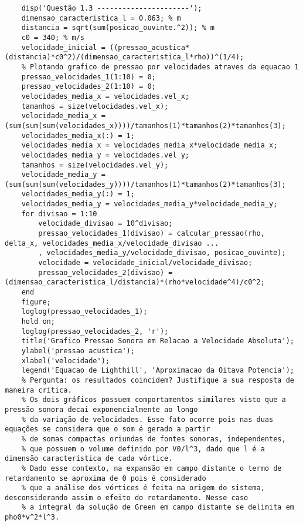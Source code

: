 \begin{enumerate}
\begin{lstlisting}
	disp('Questão 1.3 ----------------------');
	dimensao_caracteristica_l = 0.063; % m
	distancia = sqrt(sum(posicao_ouvinte.^2)); % m 
	c0 = 340; % m/s 
	velocidade_inicial = ((pressao_acustica*(distancia)*c0^2)/(dimensao_caracteristica_l*rho))^(1/4);
	% Plotando grafico de pressao por velocidades atraves da equacao 1
	pressao_velocidades_1(1:10) = 0;
	pressao_velocidades_2(1:10) = 0;
	velocidades_media_x = velocidades.vel_x;
	tamanhos = size(velocidades.vel_x);
	velocidade_media_x = (sum(sum(sum(velocidades_x))))/tamanhos(1)*tamanhos(2)*tamanhos(3);
	velocidades_media_x(:) = 1;
	velocidades_media_x = velocidades_media_x*velocidade_media_x;
	velocidades_media_y = velocidades.vel_y;
	tamanhos = size(velocidades.vel_y);
	velocidade_media_y = (sum(sum(sum(velocidades_y))))/tamanhos(1)*tamanhos(2)*tamanhos(3);
	velocidades_media_y(:) = 1;
	velocidades_media_y = velocidades_media_y*velocidade_media_y;
	for divisao = 1:10
		velocidade_divisao = 10^divisao;
		pressao_velocidades_1(divisao) = calcular_pressao(rho, delta_x, velocidades_media_x/velocidade_divisao ...
		, velocidades_media_y/velocidade_divisao, posicao_ouvinte);
		velocidade = velocidade_inicial/velocidade_divisao;
		pressao_velocidades_2(divisao) = (dimensao_caracteristica_l/distancia)*(rho*velocidade^4)/c0^2;
	end
	figure;
	loglog(pressao_velocidades_1);
	hold on;
	loglog(pressao_velocidades_2, 'r');
	title('Grafico Pressao Sonora em Relacao a Velocidade Absoluta');
	ylabel('pressao acustica');
	xlabel('velocidade');
	legend('Equacao de Lighthill', 'Aproximacao da Oitava Potencia');
	% Pergunta: os resultados coincidem? Justifique a sua resposta de maneira crítica.
	% Os dois gráficos possuem comportamentos similares visto que a pressão sonora decai exponencialmente ao longo
	% da variação de velocidades. Esse fato ocorre pois nas duas equações se considera que o som é gerado a partir 
	% de somas compactas oriundas de fontes sonoras, independentes,
	% que possuem o volume definido por V0/l^3, dado que l é a dimensão característica de cada vórtice.
	% Dado esse contexto, na expansão em campo distante o termo de retardamento se aproxima de 0 pois é considerado
	% que a análise dos vórtices é feita na origem do sistema, desconsiderando assim o efeito do retardamento. Nesse caso
	% a integral da solução de Green em campo distante se delimita em pho0*v^2*l^3.
	\end{lstlisting}

\end{enumerate}
	